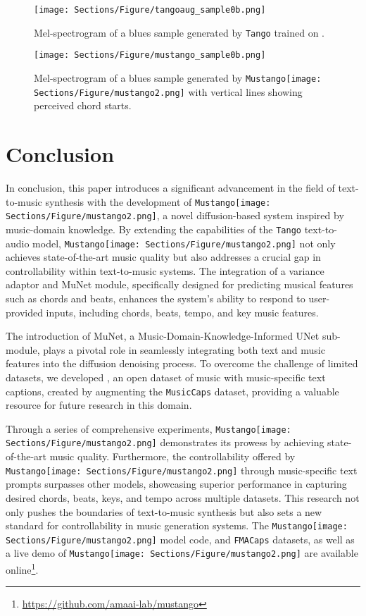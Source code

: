 \documentclass[11pt]{article}
\newcommand{\datasetFMA}{\texttt{FMACaps}}
\newcommand{\model}{\texttt{Mustango}}
\newcommand{\modelemoji}{\model{}\texttt{[image: Sections/Figure/mustango2.png]}}
\begin{document}
\begin{figure}
    \centering
    \texttt{[image: Sections/Figure/tangoaug\_sample0b.png]}
    \caption{Mel-spectrogram of a blues sample generated by \texttt{Tango} trained on \dataset{}.}
    \label{fig:sample_tango}
\end{figure}

\begin{figure}
    \centering
    \texttt{[image: Sections/Figure/mustango\_sample0b.png]}
    \caption{Mel-spectrogram of a blues sample generated by \modelemoji{} with vertical lines showing perceived chord starts.}
    \label{fig:sample_mustango}
\end{figure} \section{Conclusion}
\label{sec:conclusion}


In conclusion, this paper introduces a significant advancement in the field of text-to-music synthesis with the development of \modelemoji{}, a novel diffusion-based system inspired by music-domain knowledge. By extending the capabilities of the \texttt{Tango} text-to-audio model, \modelemoji{} not only achieves state-of-the-art music quality but also addresses a crucial gap in controllability within text-to-music systems. The integration of a variance adaptor and MuNet module, specifically designed for predicting musical features such as chords and beats, enhances the system's ability to respond to user-provided inputs, including chords, beats, tempo, and key music features.

The introduction of MuNet, a Music-Domain-Knowledge-Informed UNet sub-module, plays a pivotal role in seamlessly integrating both text and music features into the diffusion denoising process. To overcome the challenge of limited datasets, we developed \dataset{}, an open dataset of music with music-specific text captions, created by augmenting the \texttt{MusicCaps} dataset, providing a valuable resource for future research in this domain. 

Through a series of comprehensive experiments, \modelemoji{} demonstrates its prowess by achieving state-of-the-art music quality. Furthermore, the controllability offered by \modelemoji{} through music-specific text prompts surpasses other models, showcasing superior performance in capturing desired chords, beats, keys, and tempo across multiple datasets. This research not only pushes the boundaries of text-to-music synthesis but also sets a new standard for controllability in music generation systems. The \modelemoji{} model code, \dataset{} and \datasetFMA{} datasets, as well as a live demo of \modelemoji{} are available online\footnote{\url{https://github.com/amaai-lab/mustango}}. 
\end{document}
